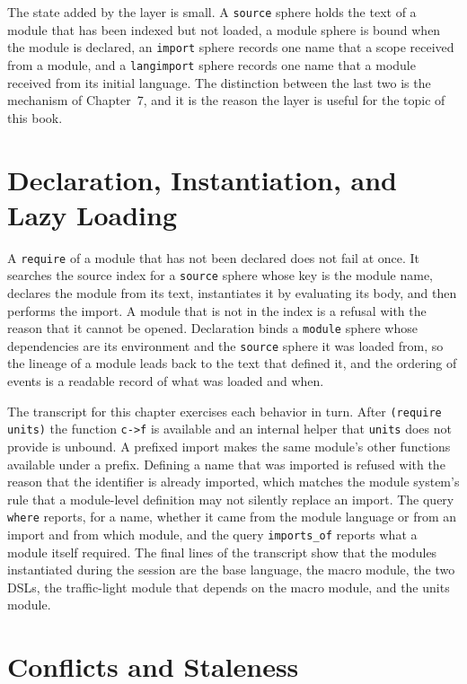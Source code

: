 \documentclass[11pt,oneside]{report}
\theoremstyle{plain}
\theoremstyle{definition}
\theoremstyle{remark}
\newcommand{\code}[2][Python]{}
\newcommand{\transcript}[1]{}
\begin{document}
The state added by the layer is small. A \texttt{source} sphere holds the text of a module that has been indexed but not loaded, a module sphere is bound when the module is declared, an \texttt{import} sphere records one name that a scope received from a module, and a \texttt{langimport} sphere records one name that a module received from its initial language. The distinction between the last two is the mechanism of Chapter~7, and it is the reason the layer is useful for the topic of this book.

\section{Declaration, Instantiation, and Lazy Loading}

A \texttt{require} of a module that has not been declared does not fail at once. It searches the source index for a \texttt{source} sphere whose key is the module name, declares the module from its text, instantiates it by evaluating its body, and then performs the import. A module that is not in the index is a refusal with the reason that it cannot be opened. Declaration binds a \texttt{module} sphere whose dependencies are its environment and the \texttt{source} sphere it was loaded from, so the lineage of a module leads back to the text that defined it, and the ordering of events is a readable record of what was loaded and when.

\code{ex_racket_module}
\code{ex_racket_find}

The transcript for this chapter exercises each behavior in turn. After \texttt{(require units)} the function \texttt{c->f} is available and an internal helper that \texttt{units} does not provide is unbound. A prefixed import makes the same module's other functions available under a prefix. Defining a name that was imported is refused with the reason that the identifier is already imported, which matches the module system's rule that a module-level definition may not silently replace an import. The query \texttt{where} reports, for a name, whether it came from the module language or from an import and from which module, and the query \texttt{imports\_of} reports what a module itself required. The final lines of the transcript show that the modules instantiated during the session are the base language, the macro module, the two DSLs, the traffic-light module that depends on the macro module, and the units module.

\transcript{racket}

\section{Conflicts and Staleness}
\end{document}
